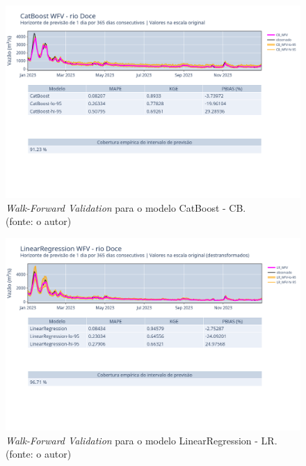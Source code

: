 \begin{figure}[!h]
	\centering
	\includegraphics[scale=0.33]{Figuras/rio_doce/wfv/CB/CB_WFV_ORIG.png}
	\caption{\textit{Walk-Forward Validation} para o modelo CatBoost - CB.\\(fonte: o autor)}
	\label{fig:doce_CB_WFV_ORIG}
\end{figure}

\begin{figure}[!h]
	\centering
	\includegraphics[scale=0.33]{Figuras/rio_doce/wfv/LR/LR_WFV_LOG.png}
	\caption{\textit{Walk-Forward Validation} para o modelo LinearRegression - LR.\\(fonte: o autor)}
	\label{fig:doce_LR_WFV_LOG}
\end{figure}

